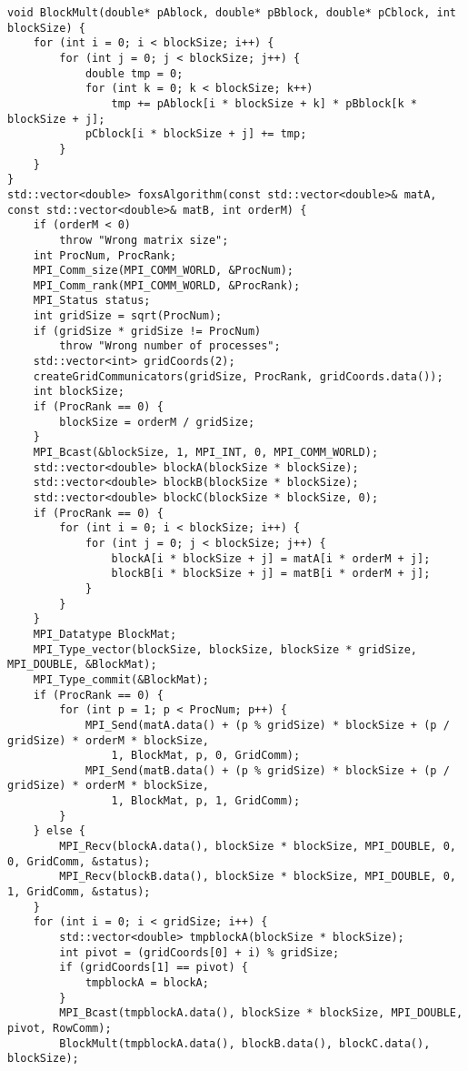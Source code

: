 \documentclass{report}
\begin{document}
\begin{lstlisting}
void BlockMult(double* pAblock, double* pBblock, double* pCblock, int blockSize) {
    for (int i = 0; i < blockSize; i++) {
        for (int j = 0; j < blockSize; j++) {
            double tmp = 0;
            for (int k = 0; k < blockSize; k++)
                tmp += pAblock[i * blockSize + k] * pBblock[k * blockSize + j];
            pCblock[i * blockSize + j] += tmp;
        }
    }
}
std::vector<double> foxsAlgorithm(const std::vector<double>& matA, const std::vector<double>& matB, int orderM) {
    if (orderM < 0)
        throw "Wrong matrix size";
    int ProcNum, ProcRank;
    MPI_Comm_size(MPI_COMM_WORLD, &ProcNum);
    MPI_Comm_rank(MPI_COMM_WORLD, &ProcRank);
    MPI_Status status;
    int gridSize = sqrt(ProcNum);
    if (gridSize * gridSize != ProcNum)
        throw "Wrong number of processes";
    std::vector<int> gridCoords(2);
    createGridCommunicators(gridSize, ProcRank, gridCoords.data());
    int blockSize;
    if (ProcRank == 0) {
        blockSize = orderM / gridSize;
    }
    MPI_Bcast(&blockSize, 1, MPI_INT, 0, MPI_COMM_WORLD);
    std::vector<double> blockA(blockSize * blockSize);
    std::vector<double> blockB(blockSize * blockSize);
    std::vector<double> blockC(blockSize * blockSize, 0);
    if (ProcRank == 0) {
        for (int i = 0; i < blockSize; i++) {
            for (int j = 0; j < blockSize; j++) {
                blockA[i * blockSize + j] = matA[i * orderM + j];
                blockB[i * blockSize + j] = matB[i * orderM + j];
            }
        }
    }
    MPI_Datatype BlockMat;
    MPI_Type_vector(blockSize, blockSize, blockSize * gridSize, MPI_DOUBLE, &BlockMat);
    MPI_Type_commit(&BlockMat);
    if (ProcRank == 0) {
        for (int p = 1; p < ProcNum; p++) {
            MPI_Send(matA.data() + (p % gridSize) * blockSize + (p / gridSize) * orderM * blockSize,
                1, BlockMat, p, 0, GridComm);
            MPI_Send(matB.data() + (p % gridSize) * blockSize + (p / gridSize) * orderM * blockSize,
                1, BlockMat, p, 1, GridComm);
        }
    } else {
        MPI_Recv(blockA.data(), blockSize * blockSize, MPI_DOUBLE, 0, 0, GridComm, &status);
        MPI_Recv(blockB.data(), blockSize * blockSize, MPI_DOUBLE, 0, 1, GridComm, &status);
    }
    for (int i = 0; i < gridSize; i++) {
        std::vector<double> tmpblockA(blockSize * blockSize);
        int pivot = (gridCoords[0] + i) % gridSize;
        if (gridCoords[1] == pivot) {
            tmpblockA = blockA;
        }
        MPI_Bcast(tmpblockA.data(), blockSize * blockSize, MPI_DOUBLE, pivot, RowComm);
        BlockMult(tmpblockA.data(), blockB.data(), blockC.data(), blockSize);

\end{lstlisting}
\end{document}
